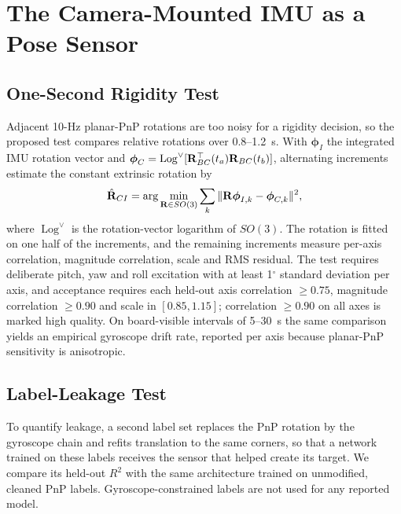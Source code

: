 \section{The Camera-Mounted IMU as a Pose Sensor}
\label{sec:imu}

\subsection{One-Second Rigidity Test}
Adjacent 10-Hz planar-PnP rotations are too noisy for a rigidity decision, so
the proposed test compares relative rotations over 0.8--1.2~s. With
$\boldsymbol\phi_I$ the integrated IMU rotation vector and
$\boldsymbol\phi_C=\operatorname{Log}^{\vee}
[{\bf R}_{BC}^{\top}(t_a){\bf R}_{BC}(t_b)]$,
alternating increments estimate the constant extrinsic rotation by
\begin{equation}
 \hat{\bf R}_{CI}=\arg\min_{{\bf R}\in SO(3)}
 \sum_k\|{\bf R}\boldsymbol\phi_{I,k}-\boldsymbol\phi_{C,k}\|^2 ,
\end{equation}
where $\operatorname{Log}^{\vee}$ is the rotation-vector logarithm of
$SO(3)$. The rotation is fitted on one half of the increments, and the
remaining increments measure per-axis correlation, magnitude
correlation, scale and RMS residual. The test requires deliberate pitch, yaw
and roll excitation with at least 1$^\circ$ standard deviation per axis, and
acceptance requires each held-out axis correlation $\geq0.75$, magnitude
correlation $\geq0.90$ and scale in $[0.85,1.15]$; correlation $\geq0.90$ on
all axes is marked high quality. On board-visible intervals of 5--30~s the
same comparison yields an empirical gyroscope drift rate, reported per axis
because planar-PnP sensitivity is anisotropic.

\subsection{Label-Leakage Test}
To quantify leakage, a second label set replaces the PnP rotation by the
gyroscope chain and refits translation to the same corners, so that a network
trained on these labels receives the sensor that helped create its target. We
compare its held-out $R^2$ with the same architecture trained on unmodified,
cleaned PnP labels. Gyroscope-constrained labels are not used for any
reported model.
